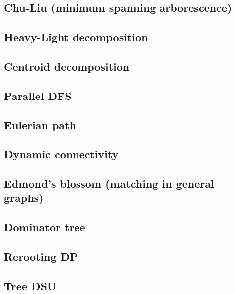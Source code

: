 \subsection{Chu-Liu (minimum spanning arborescence)}

\subsection{Heavy-Light decomposition}

\subsection{Centroid decomposition}

\subsection{Parallel DFS}

\subsection{Eulerian path}

\subsection{Dynamic connectivity}

\subsection{Edmond's blossom (matching in general graphs)}

\subsection{Dominator tree}

\subsection{Rerooting DP}

\subsection{Tree DSU}

